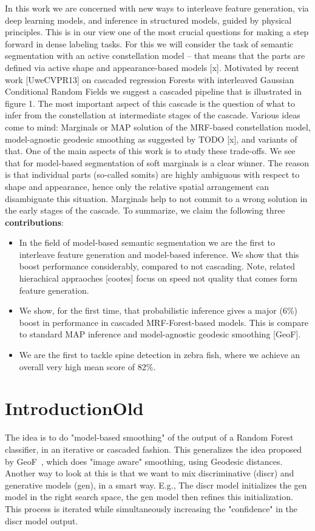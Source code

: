 \documentclass[10pt,twocolumn,letterpaper]{article}
\begin{document}
In this work we are concerned with new ways to interleave feature generation, via deep learning models, and inference in structured models, guided by physical principles. This is in our view one of the most crucial questions for making a step forward in dense labeling tasks. For this we will consider the task of semantic segmentation with an active constellation model – that means that the parts are defined via active shape and appearance-based models [x]. Motivated by recent work [UweCVPR13] on cascaded regression Forests with interleaved Gaussian Conditional Random Fields we suggest a cascaded pipeline that is illustrated in figure 1. The most important aspect of this cascade is the question of what to infer from the constellation at intermediate stages of the cascade. Various ideas come to mind: Marginals or MAP solution of the MRF-based constellation model, model-agnostic geodesic smoothing as suggested by TODO [x], and variants of that. One of the main aspects of this work is to study these trade-offs. We see that for model-based segmentation of soft marginals is a clear winner. The reason is that individual parts (so-called somits) are highly ambiguous with respect to shape and appearance, hence only the relative spatial arrangement can disambiguate this situation. Marginals help to not commit to a wrong solution in the early stages of the cascade.
To summarize, we claim the following three {\bf contributions}:
\begin{itemize}
\item In the field of model-based semantic segmentation we are the first to interleave feature generation and model-based inference. We show that this boost performance considerably, compared to not cascading. Note, related hierachical appraoches [cootes] focus on speed not quality that comes form feature generation. 
\item We show, for the first time, that probabilistic inference gives a major (6\%) boost in performance in cascaded MRF-Forest-based models. This is compare to standard MAP inference and model-agnostic geodesic smoothing [GeoF]. 
\item We are the first to tackle spine detection in zebra fish, where we achieve an overall very high mean score of 82\%.
\end{itemize}



\section{IntroductionOld}
The idea is to do "model-based smoothing" of the output of a Random Forest classifier, in an iterative or cascaded fashion.  This generalizes the idea proposed by GeoF~\cite{GeoForests2013}, which does "image aware" smoothing, using Geodesic distances. 
%
Another way to look at this is that we want to mix discriminative (discr) and generative models (gen), in a smart way.  E.g., The discr model initializes the gen model in the right search space, the gen model then refines this initialization.  This process is iterated while simultaneously increasing the "confidence" in the discr model output. 
\end{document}
